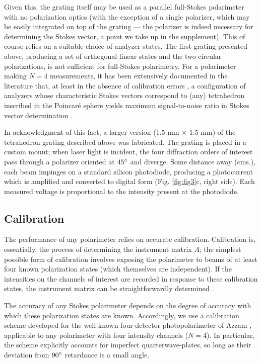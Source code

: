 \documentclass[footinbib,aps,prl,twocolumn,superscriptaddress]{revtex4-1}
\begin{document}
Given this, the grating itself may be used as a parallel full-Stokes polarimeter with no polarization optics (with the exception of a single polarizer, which may be easily integrated on top of the grating --- the polarizer is indeed necessary for determining the Stokes vector, a point we take up in the supplement). This of course relies on a suitable choice of analyzer states. The first grating presented above, producing a set of orthogonal linear states and the two circular polarizations, is not sufficient for full-Stokes polarimetry. For a polarimeter making $N=4$ measurements, it has been extensively documented in the literature that, at least in the absence of calibration errors \cite{Tyo2002}, a configuration of analyzers whose characteristic Stokes vectors correspond to (any) tetrahedron inscribed in the Poincar\'e sphere yields maximum signal-to-noise ratio in Stokes vector determination \cite{Sabatke2000}.

In acknowledgment of this fact, a larger version (1.5 mm $\times$ 1.5 mm) of the tetrahedron grating described above was fabricated. The grating is placed in a custom mount; when laser light is incident, the four diffraction orders of interest pass through a polarizer oriented at $45\degree$ and diverge. Some distance away (cms.), each beam impinges on a standard silicon photodiode, producing a photocurrent which is amplified and converted to digital form (Fig. \ref{fig:fig3}c, right side). Each measured voltage is proportional to the intensity present at the photodiode.

\subsection{Calibration}

The performance of any polarimeter relies on accurate calibration. Calibration is, essentially, the process of determining the instrument matrix $A$; the simplest possible form of calibration involves exposing the polarimeter to beams of at least four known polarization states (which themselves are independent). If the intensities on the channels of interest are recorded in response to these calibration states, the instrument matrix can be straightforwardly determined  \cite{Azzam2016}.

The accuracy of any Stokes polarimeter depends on the degree of accuracy with which these polarization states are known. Accordingly, we use a calibration scheme \cite{Azzam1989} developed for the well-known four-detector photopolarimeter of Azzam \cite{Azzam1985}, applicable to any polarimeter with four intensity channels ($N=4$). In particular, the scheme explicitly accounts for imperfect quarterwave-plates, so long as their deviation from $90\degree$ retardance is a small angle.
\end{document}
